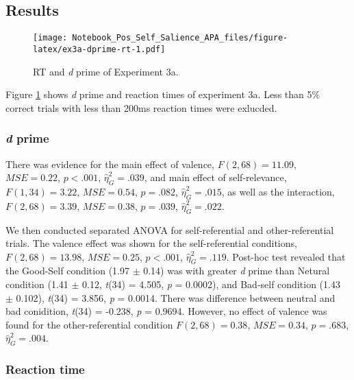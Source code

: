 \documentclass[man]{apa6}
\begin{document}
\hypertarget{results-4}{%
\subsection{Results}\label{results-4}}

\begin{figure}
\centering
\texttt{[image: Notebook\_Pos\_Self\_Salience\_APA\_files/figure-latex/ex3a-dprime-rt-1.pdf]}
\caption{\label{fig:ex3a-dprime-rt}RT and \emph{d} prime of Experiment 3a.}
\end{figure}

Figure \ref{fig:ex3a-dprime-rt} shows \emph{d} prime and reaction times of experiment 3a. Less than 5\% correct trials with less than 200ms reaction times were exlucded.

\hypertarget{d-prime-2}{%
\subsubsection{\texorpdfstring{\emph{d} prime}{d prime}}\label{d-prime-2}}

There was evidence for the main effect of valence, \(F(2, 68) = 11.09\), \(\mathit{MSE} = 0.22\), \(p < .001\), \(\hat{\eta}^2_G = .039\), and main effect of self-relevance, \(F(1, 34) = 3.22\), \(\mathit{MSE} = 0.54\), \(p = .082\), \(\hat{\eta}^2_G = .015\), as well as the interaction, \(F(2, 68) = 3.39\), \(\mathit{MSE} = 0.38\), \(p = .039\), \(\hat{\eta}^2_G = .022\).

We then conducted separated ANOVA for self-referential and other-referential trials. The valence effect was shown for the self-referential conditions, \(F(2, 68) = 13.98\), \(\mathit{MSE} = 0.25\), \(p < .001\), \(\hat{\eta}^2_G = .119\). Post-hoc test revealed that the Good-Self condition (1.97 \(\pm\) 0.14) was with greater \emph{d} prime than Netural condition (1.41 \(\pm\) 0.12, \emph{t}(34) = 4.505, \emph{p} = 0.0002), and Bad-self condition (1.43 \(\pm\) 0.102), \emph{t}(34) = 3.856, \emph{p} = 0.0014. There was difference between neutral and bad conidition, \emph{t}(34) = -0.238, \emph{p} = 0.9694. However, no effect of valence was found for the other-referential condition \(F(2, 68) = 0.38\), \(\mathit{MSE} = 0.34\), \(p = .683\), \(\hat{\eta}^2_G = .004\).

\hypertarget{reaction-time-3}{%
\subsubsection{Reaction time}\label{reaction-time-3}}
\end{document}
